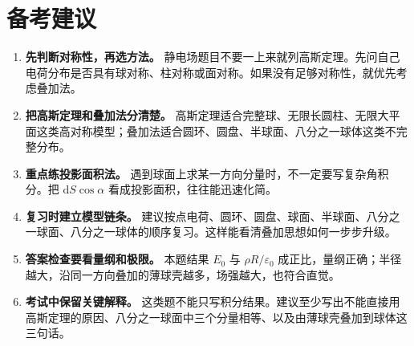 \documentclass[11pt,a4paper,fontset=fandol]{ctexart}
\newcommand{\dd}{\mathrm{d}}
\newcommand{\eps}{\varepsilon_0}
\begin{document}
\section*{备考建议}
\begin{tipBox}
\begin{enumerate}
 \item \textbf{先判断对称性，再选方法。} 静电场题目不要一上来就列高斯定理。先问自己电荷分布是否具有球对称、柱对称或面对称。如果没有足够对称性，就优先考虑叠加法。
 \item \textbf{把高斯定理和叠加法分清楚。} 高斯定理适合完整球、无限长圆柱、无限大平面这类高对称模型；叠加法适合圆环、圆盘、半球面、八分之一球体这类不完整分布。
 \item \textbf{重点练投影面积法。} 遇到球面上求某一方向分量时，不一定要写复杂角积分。把 $\dd S\cos\alpha$ 看成投影面积，往往能迅速化简。
 \item \textbf{复习时建立模型链条。} 建议按点电荷、圆环、圆盘、球面、半球面、八分之一球面、八分之一球体的顺序复习。这样能看清叠加思想如何一步步升级。
 \item \textbf{答案检查要看量纲和极限。} 本题结果 $E_0$ 与 $\rho R/\eps$ 成正比，量纲正确；半径越大，沿同一方向叠加的薄球壳越多，场强越大，也符合直觉。
 \item \textbf{考试中保留关键解释。} 这类题不能只写积分结果。建议至少写出不能直接用高斯定理的原因、八分之一球面中三个分量相等、以及由薄球壳叠加到球体这三句话。
\end{enumerate}
\end{tipBox}
\end{document}
